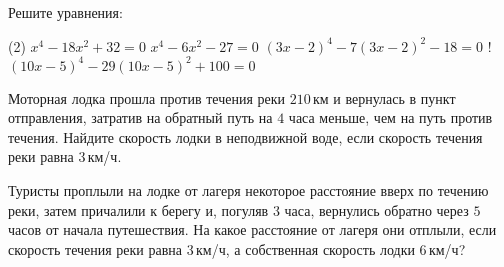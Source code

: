 \begin{homework}[number=4]
	\begin{listofex}
		\item Решите уравнения: 
		\begin{tasks}(2)
			\task \( x^{4}-18x^{2}+32=0 \)
			\task \( x^{4}-6x^{2}-27=0 \)
			\task \( (3x-2)^{4}-7(3x-2)^{2}-18=0 \)
			\task! \( (10x-5)^{4}-29(10x-5)^{2}+100=0 \)
		\end{tasks}
		\item Моторная лодка прошла против течения реки \( 210 \) км и вернулась в пункт отправления, затратив на обратный путь на \( 4 \) часа меньше, чем на путь против течения. Найдите скорость лодки в неподвижной воде, если скорость течения реки равна \( 3 \) км/ч.
		\item Туристы проплыли на лодке от лагеря некоторое расстояние вверх по течению реки, затем причалили к берегу и, погуляв \( 3 \) часа, вернулись обратно через \( 5 \) часов от начала путешествия. На какое расстояние от лагеря они отплыли, если скорость течения реки равна \( 3 \) км/ч, а собственная скорость лодки \( 6 \) км/ч?
	\end{listofex}
\end{homework}
